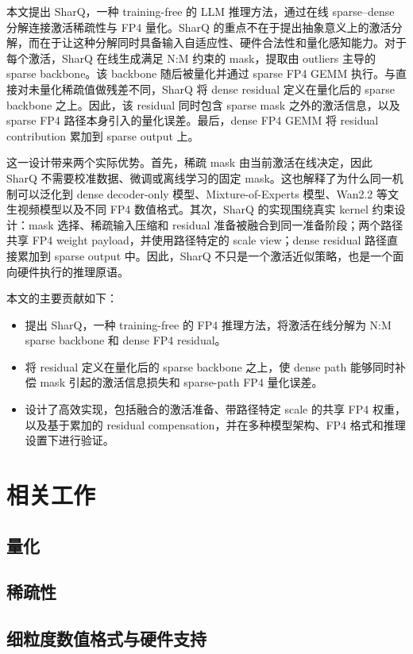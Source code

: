 \documentclass{article}
\begin{document}
本文提出 SharQ，一种 training-free 的 LLM 推理方法，通过在线 sparse--dense 分解连接激活稀疏性与 FP4 量化。SharQ 的重点不在于提出抽象意义上的激活分解，而在于让这种分解同时具备输入自适应性、硬件合法性和量化感知能力。对于每个激活，SharQ 在线生成满足 N:M 约束的 mask，提取由 outliers 主导的 sparse backbone。该 backbone 随后被量化并通过 sparse FP4 GEMM 执行。与直接对未量化稀疏值做残差不同，SharQ 将 dense residual 定义在量化后的 sparse backbone 之上。因此，该 residual 同时包含 sparse mask 之外的激活信息，以及 sparse FP4 路径本身引入的量化误差。最后，dense FP4 GEMM 将 residual contribution 累加到 sparse output 上。

这一设计带来两个实际优势。首先，稀疏 mask 由当前激活在线决定，因此 SharQ 不需要校准数据、微调或离线学习的固定 mask。这也解释了为什么同一机制可以泛化到 dense decoder-only 模型、Mixture-of-Experts 模型、Wan2.2 等文生视频模型以及不同 FP4 数值格式。其次，SharQ 的实现围绕真实 kernel 约束设计：mask 选择、稀疏输入压缩和 residual 准备被融合到同一准备阶段；两个路径共享 FP4 weight payload，并使用路径特定的 scale view；dense residual 路径直接累加到 sparse output 中。因此，SharQ 不只是一个激活近似策略，也是一个面向硬件执行的推理原语。

本文的主要贡献如下：
\begin{itemize}
  \item 提出 SharQ，一种 training-free 的 FP4 推理方法，将激活在线分解为 N:M sparse backbone 和 dense FP4 residual。
  \item 将 residual 定义在量化后的 sparse backbone 之上，使 dense path 能够同时补偿 mask 引起的激活信息损失和 sparse-path FP4 量化误差。
  \item 设计了高效实现，包括融合的激活准备、带路径特定 scale 的共享 FP4 权重，以及基于累加的 residual compensation，并在多种模型架构、FP4 格式和推理设置下进行验证。
\end{itemize}

\section{相关工作}

\subsection{量化}

\subsection{稀疏性}

\subsection{细粒度数值格式与硬件支持}
\end{document}
